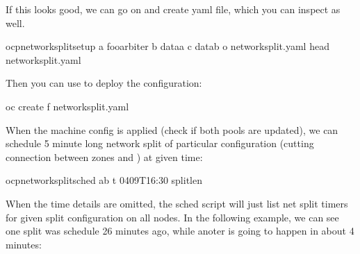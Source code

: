 \documentclass[letterpaper,10pt,english]{sphinxmanual}
\begin{document}
If this looks good, we can go on and create  yaml file, which
you can inspect as well.

\begin{sphinxVerbatim}[commandchars=\\\{\}]
 ocp\PYGZhy{}network\PYGZhy{}split\PYGZhy{}setup \PYGZhy{}a foo\PYGZhy{}arbiter \PYGZhy{}b data\PYGZhy{}a \PYGZhy{}c data\PYGZhy{}b \PYGZhy{}o network\PYGZhy{}split.yaml
 head network\PYGZhy{}split.yaml
\end{sphinxVerbatim}

Then you can use  to deploy the configuration:

\begin{sphinxVerbatim}[commandchars=\\\{\}]
 oc create \PYGZhy{}f network\PYGZhy{}split.yaml
\end{sphinxVerbatim}

When the machine config is applied (check  if both pools are
updated), we can schedule 5 minute long network split of particular
configuration  (cutting connection between zones  and ) at
given time:

\begin{sphinxVerbatim}[commandchars=\\\{\}]
 ocp\PYGZhy{}network\PYGZhy{}split\PYGZhy{}sched ab \PYGZhy{}t \PYGZhy{}04\PYGZhy{}09T16:30 \PYGZhy{}\PYGZhy{}split\PYGZhy{}len 
\end{sphinxVerbatim}

When the time details are omitted, the sched script will just list net split
timers for given split configuration on all nodes. In the following example,
we can see one split was schedule 26 minutes ago, while anoter is going to
happen in about 4 minutes:
\end{document}
